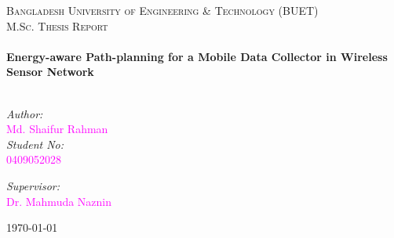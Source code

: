\begin{titlepage}
	\begin{center}
		\textsc{\LARGE Bangladesh University of Engineering \& Technology (BUET)}\\[1.5cm]
		\textsc{\Large M.Sc. Thesis Report}\\[0.5cm]
		\HRule \\[0.4cm]
		{ \huge \textbf{Energy-aware Path-planning for a Mobile Data Collector in Wireless Sensor
						Network}}\\[0.4cm]
		\HRule \\[1.5cm]
		\begin{minipage}{0.4\textwidth}
		\begin{flushleft} \large
		\emph{Author:}\\
		 \textcolor{magenta}{Md. Shaifur Rahman}\\
		 \emph{Student No: } \\ 
		 \textcolor{magenta}{0409052028}
		\end{flushleft}
		\end{minipage}
		\begin{minipage}{0.4\textwidth}
		\begin{flushright} \large
		\emph{Supervisor:} \\
		 \textcolor{magenta}{Dr. Mahmuda Naznin}
		\end{flushright}
		\end{minipage}
		\vfill
		{\large \today}
	\end{center}
\end{titlepage}